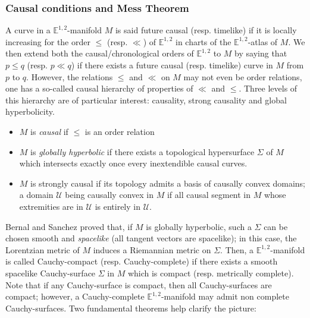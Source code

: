 \documentclass[a4paper,12pt]{article}
\def\U{\mathcal U}
\newcommand{\mass}[1]{{\mathbb E}^{1,2}_{#1}}
\begin{document}
\subsubsection*{Causal conditions and Mess Theorem}

A curve in a $\mass{}$-manifold $M$ is said future causal (resp. timelike)  if it is  locally increasing for the order $\leq$ (resp. $\ll$) of $\mass{}$ in charts of the $\mass{}$-atlas of $M$. 
We then extend both the causal/chronological orders of $\mass{}$ to $M$ by saying that $p\leq q$ (resp. $p\ll q$) if there exists a future causal (resp. timelike) curve in $M$ from $p$ to $q$. 
However, the relations $\leq$ and $\ll$ on $M$ may not even be order relations, one has a so-called causal hierarchy \cite{MR0469146,MR2436235} of properties of $\ll$ and $\leq$. 
Three levels of this hierarchy are of particular interest: causality, strong causality and global hyperbolicity. 
\begin{itemize}
\item $M$ is  {\it causal} if $\leq$ is an order relation 
\item $M$ is {\it globally hyperbolic} if there exists a topological hypersurface $\Sigma$ of $M$ which intersects exactly once every inextendible causal curves. 
\item $M$ is strongly causal if its topology admits a basis of causally convex domains; a domain $\U$ being causally convex in $M$ if all causal segment in $M$ whose extremities are in $\U$ is entirely in $\U$.
\end{itemize}
 Bernal and Sanchez \cite{sanchez_smooth} proved that, if $M$ is  globally hyperbolic, such a $\Sigma$ can be chosen smooth and {\it spacelike} (all tangent vectors are spacelike); in this case, the Lorentzian metric of $M$ induces a Riemannian metric on $\Sigma$. Then, a $\mass{}$-manifold is called Cauchy-compact (resp. Cauchy-complete) if there exists a smooth spacelike Cauchy-surface $\Sigma$ in $M$ which is compact (resp. metrically complete). Note that if any Cauchy-surface is compact, then all Cauchy-surfaces are compact; however, a Cauchy-complete $\mass{}$-manifold may admit non complete Cauchy-surfaces. Two fundamental theorems help clarify the picture: 
 
 
 
\end{document}
